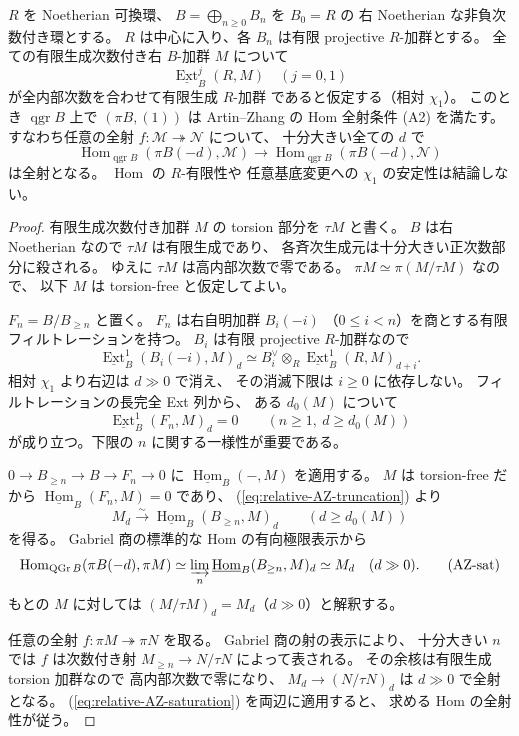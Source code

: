 \begin{lemma}
\label{lem:relative-chi1-implies-AZ-A2}
$R$ を Noetherian 可換環、
$B=\bigoplus_{n\ge0}B_n$ を $B_0=R$ の
右 Noetherian な非負次数付き環とする。
$R$ は中心に入り、各 $B_n$ は有限 projective $R$-加群とする。
全ての有限生成次数付き右 $B$-加群 $M$ について
\[
 \underline{\operatorname{Ext}}_B^j(R,M)
 \quad(j=0,1)
\]
が全内部次数を合わせて有限生成 $R$-加群
であると仮定する（相対 $\chi_1$）。
このとき $\operatorname{qgr}B$ 上で
$(\pi B,(1))$ は Artin--Zhang の
Hom 全射条件 (A2) を満たす。
すなわち任意の全射
$f:\mathcal M\twoheadrightarrow\mathcal N$ について、
十分大きい全ての $d$ で
\[
 \operatorname{Hom}_{\operatorname{qgr}B}
       (\pi B(-d),\mathcal M)
 \longrightarrow
 \operatorname{Hom}_{\operatorname{qgr}B}
       (\pi B(-d),\mathcal N)
\]
は全射となる。
$\operatorname{Hom}$ の $R$-有限性や
任意基底変更への $\chi_1$ の安定性は結論しない。
\end{lemma}
\begin{proof}
有限生成次数付き加群 $M$ の torsion 部分を $\tau M$ と書く。
$B$ は右 Noetherian なので $\tau M$ は有限生成であり、
各斉次生成元は十分大きい正次数部分に殺される。
ゆえに $\tau M$ は高内部次数で零である。
$\pi M\simeq\pi(M/\tau M)$ なので、
以下 $M$ は torsion-free と仮定してよい。

$F_n=B/B_{\ge n}$ と置く。
$F_n$ は右自明加群 $B_i(-i)$
（$0\le i<n$）を商とする有限フィルトレーションを持つ。
$B_i$ は有限 projective $R$-加群なので
\[
 \underline{\operatorname{Ext}}_B^1
       (B_i(-i),M)_d
 \simeq B_i^\vee\otimes_R
      \underline{\operatorname{Ext}}_B^1(R,M)_{d+i}.
\]
相対 $\chi_1$ より右辺は $d\gg0$ で消え、
その消滅下限は $i\ge0$ に依存しない。
フィルトレーションの長完全 Ext 列から、
ある $d_0(M)$ について
\[
 \underline{\operatorname{Ext}}_B^1(F_n,M)_d=0
 \qquad(n\ge1,\ d\ge d_0(M))
 \tag{AZ-trunc}\label{eq:relative-AZ-truncation}
\]
が成り立つ。下限の $n$ に関する一様性が重要である。

$0\to B_{\ge n}\to B\to F_n\to0$ に
$\underline{\operatorname{Hom}}_B(-,M)$ を適用する。
$M$ は torsion-free だから
$\underline{\operatorname{Hom}}_B(F_n,M)=0$ であり、
(\ref{eq:relative-AZ-truncation}) より
\[
 M_d\xrightarrow{\sim}
  \underline{\operatorname{Hom}}_B(B_{\ge n},M)_d
 \qquad(d\ge d_0(M))
\]
を得る。
Gabriel 商の標準的な Hom の有向極限表示から
\[
 \operatorname{Hom}_{\operatorname{QGr}B}
      (\pi B(-d),\pi M)
 \simeq
 \varinjlim_n
     \underline{\operatorname{Hom}}_B(B_{\ge n},M)_d
 \simeq M_d
 \quad(d\gg0).
 \tag{AZ-sat}\label{eq:relative-AZ-saturation}
\]
もとの $M$ に対しては
$(M/\tau M)_d=M_d$（$d\gg0$）と解釈する。

任意の全射 $f:\pi M\twoheadrightarrow\pi N$ を取る。
Gabriel 商の射の表示により、
十分大きい $n$ では $f$ は次数付き射
$M_{\ge n}\to N/\tau N$ によって表される。
その余核は有限生成 torsion 加群なので
高内部次数で零になり、
$M_d\to(N/\tau N)_d$ は $d\gg0$ で全射となる。
(\ref{eq:relative-AZ-saturation}) を両辺に適用すると、
求める Hom の全射性が従う。
\end{proof}

